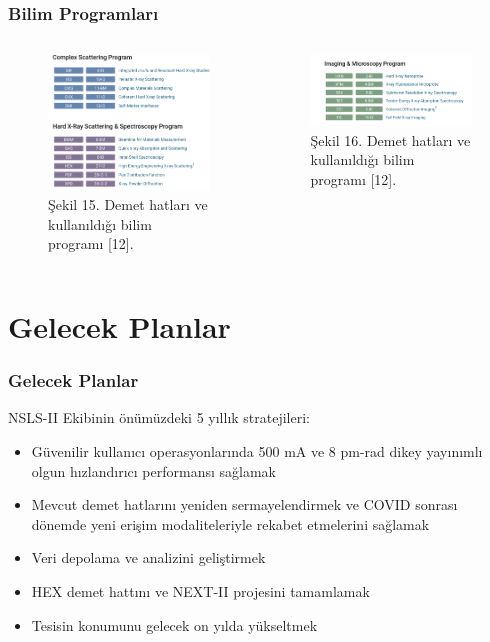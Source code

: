 \documentclass[aspectratio=169,10pt]{beamer}
\begin{document}
\begin{frame}[allowframebreaks]
\frametitle{Bilim Programları}

\begin{columns}

		\begin{figure}[h!]
 \centering
\includegraphics[width=7cm]{program 2.png}
\caption*{Şekil 15. Demet hatları ve kullanıldığı bilim programı [12].}
\end{figure}
 
\centering
		\begin{figure}[h!]
 \centering
\includegraphics[width=7cm]{program2.2.png}
\caption*{Şekil 16. Demet hatları ve kullanıldığı bilim programı [12].}
\end{figure}
	\end{columns}
\end{frame}


\section{Gelecek Planlar}
\begin{frame}[allowframebreaks]
\frametitle{Gelecek Planlar}

NSLS-II Ekibinin önümüzdeki 5 yıllık stratejileri:

\begin{itemize}
    \item Güvenilir kullanıcı operasyonlarında 500 mA ve 8 pm-rad dikey yayınımlı olgun hızlandırıcı performansı sağlamak
    \item Mevcut demet hatlarını yeniden sermayelendirmek ve COVID sonrası dönemde yeni erişim modaliteleriyle rekabet etmelerini sağlamak
    \item Veri depolama ve analizini geliştirmek
    \item HEX demet hattını ve NEXT-II projesini tamamlamak
    \item Tesisin konumunu gelecek on yılda yükseltmek
\end{itemize}

\end{frame}
\end{document}
